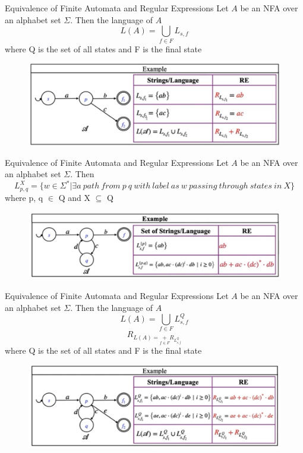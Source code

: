 \documentclass{beamer}
\begin{document}
\begin{frame}{Equivalence of Finite Automata and Regular Expressions}
		Let $A$ be an NFA over an alphabet set $\Sigma$. Then the language of $A$
	$$L(A)=\bigcup_{f\in F} L_{s,f}$$
	where Q is the set of all states and F is the final state
		\begin{figure}
		\includegraphics[scale=.5]{img2/m22}
	\end{figure}
\end{frame}
\begin{frame}{Equivalence of Finite Automata and Regular Expressions}
		Let $A$ be an NFA over an alphabet set $\Sigma$. Then
	$$L_{p,q}^X=\{w \in \Sigma^* \big | \exists a \ path\ from \ p \ q\ with \ label \ as \ w \ passing \ through \ states \ in \ X\}$$
	where p, q $\in$ Q and X $\subseteq$ Q
		\begin{figure}
		\includegraphics[scale=.5]{img2/m23}
	\end{figure}
\end{frame}
\begin{frame}{Equivalence of Finite Automata and Regular Expressions}
	Let $A$ be an NFA over an alphabet set $\Sigma$. Then the language of $A$
	$$L(A)=\bigcup_{f\in F} L_{s,f}^Q$$
	$$R_{L(A)=\underset{f \in F}{+}R_{L_{s,f}^Q}}$$
	where Q is the set of all states and F is the final state
	\begin{figure}
		\includegraphics[scale=.5]{img2/m24}
	\end{figure}
\end{frame}
\end{document}
